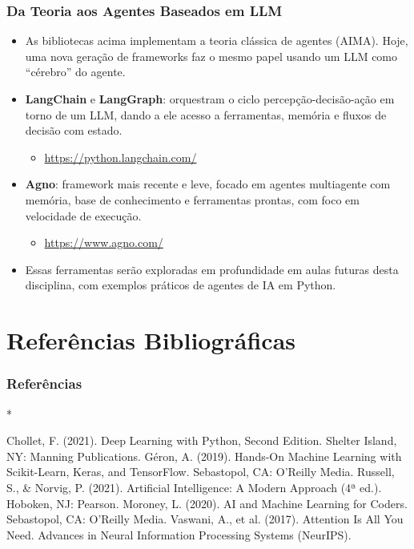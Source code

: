 \documentclass{beamer}
\begin{document}
\begin{frame}
\frametitle{Da Teoria aos Agentes Baseados em LLM}
\footnotesize
\begin{itemize}
    \item As bibliotecas acima implementam a teoria clássica de agentes (AIMA). Hoje, uma nova geração de frameworks faz o mesmo papel usando um LLM como ``cérebro'' do agente.
    \item \textbf{LangChain} e \textbf{LangGraph}: orquestram o ciclo percepção-decisão-ação em torno de um LLM, dando a ele acesso a ferramentas, memória e fluxos de decisão com estado.
    \begin{itemize}
        \item \url{https://python.langchain.com/}
    \end{itemize}
    \item \textbf{Agno}: framework mais recente e leve, focado em agentes multiagente com memória, base de conhecimento e ferramentas prontas, com foco em velocidade de execução.
    \begin{itemize}
        \item \url{https://www.agno.com/}
    \end{itemize}
    \item Essas ferramentas serão exploradas em profundidade em aulas futuras desta disciplina, com exemplos práticos de agentes de IA em Python.
\end{itemize}
\end{frame}


\section{Referências Bibliográficas}
\begin{frame}[t,allowframebreaks]
\frametitle{Referências}
%
%
\begin{thebibliography}{*}

          Chollet, F. (2021). Deep Learning with Python, Second Edition. Shelter Island, NY: Manning Publications.
         Géron, A. (2019). Hands-On Machine Learning with Scikit-Learn, Keras, and TensorFlow. Sebastopol, CA: O'Reilly Media.
         Russell, S., \& Norvig, P. (2021). Artificial Intelligence: A Modern Approach (4ª ed.). Hoboken, NJ: Pearson.
         Moroney, L. (2020). AI and Machine Learning for Coders. Sebastopol, CA: O'Reilly Media.
         Vaswani, A., et al. (2017). Attention Is All You Need. Advances in Neural Information Processing Systems (NeurIPS).

\end{thebibliography}
\end{frame}
\section{}


\begin{frame}
\titlepage
\end{frame}
\end{document}

